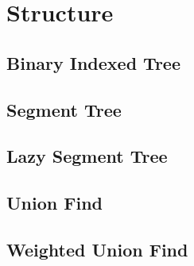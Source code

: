 \section{Structure}

\subsection{Binary Indexed Tree}


\subsection{Segment Tree}


\subsection{Lazy Segment Tree}


\subsection{Union Find}


\subsection{Weighted Union Find}

